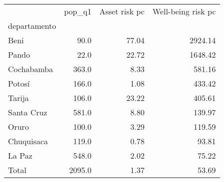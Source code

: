 \begin{tabular}{lrrr}
\toprule
{} &  pop\_q1 &  Asset risk pc &  Well-being risk pc \\
departamento &         &                &                     \\
\midrule
Beni         &    90.0 &          77.04 &             2924.14 \\
Pando        &    22.0 &          22.72 &             1648.42 \\
Cochabamba   &   363.0 &           8.33 &              581.16 \\
Potosí       &   166.0 &           1.08 &              433.42 \\
Tarija       &   106.0 &          23.22 &              405.61 \\
Santa Cruz   &   581.0 &           8.80 &              139.97 \\
Oruro        &   100.0 &           3.29 &              119.59 \\
Chuquisaca   &   119.0 &           0.78 &               93.81 \\
La Paz       &   548.0 &           2.02 &               75.22 \\
Total        &  2095.0 &           1.37 &               53.69 \\
\bottomrule
\end{tabular}
